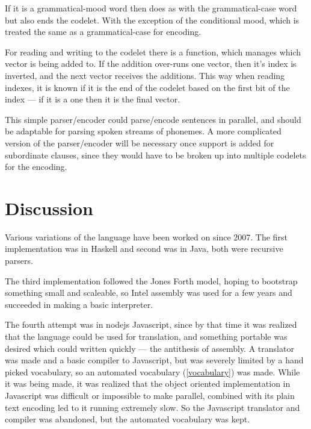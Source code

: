  If it is a grammatical-mood word then does as with the grammatical-case word
 but also ends the codelet. With the exception of the conditional mood, which is
 treated the same as a grammatical-case for encoding. 

 For reading and writing to the codelet there is a function, which manages which
 vector is being added to. If the addition over-runs one vector, then it's index
 is inverted, and the next vector receives the additions. This way when reading
 indexes, it is known if it is the end of the codelet based on the first bit of
 the index --- if it is a one then it is the final vector. 

This simple parser/encoder could parse/encode sentences in parallel, and should be
adaptable for parsing spoken streams of phonemes. A more complicated version of
the parser/encoder will be necessary once support is added for subordinate
clauses, since they would have to be broken up into multiple codelets for the
encoding. 

%
%
%


\section{Discussion}
Various variations of the language have been worked on since 2007. 
The first implementation\cite{rpoku} was in Haskell and second was in 
 Java\cite{rpokuJava}, both were recursive parsers.

The third implementation\cite{spel} followed the Jones Forth\cite{jonesForth} model, 
hoping to bootstrap something small and scaleable, so Intel
assembly was used for a few years and succeeded in making a basic interpreter.  

The fourth attempt\cite{speljs} was in nodejs Javascript, since by that time it
was realized that the language could be used for translation, and 
something portable was desired which could written quickly --- the antithesis of
assembly. A translator was made and a basic compiler to Javascript, but was severely limited
by a hand picked vocabulary, so an automated vocabulary (\ref{vocabulary}) was made.
While it was being made, it was realized that the object oriented 
implementation in Javascript was difficult or impossible to make parallel,
combined with its plain text encoding led to it running extremely slow. So the
Javascript translator and compiler was abandoned, but the automated vocabulary
was kept. 

